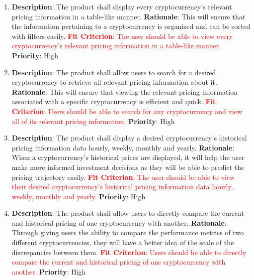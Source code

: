\documentclass[12pt, titlepage]{article}
\begin{document}
\begin{enumerate}[label = FR-\arabic*, left=\parindent, series=fr]
    \item \textbf{Description}: The product shall display every cryptocurrency's relevant pricing information in a table-like manner.
    \newline \textbf{Rationale}: This will ensure that the information pertaining to a cryptocurrency is organized and can be sorted with filters easily.
    \newline \textcolor{red} {\textbf{Fit Criterion}: The user should be able to view every cryptocurrency's relevant pricing information in a table-like manner.}
    \newline \textbf{Priority}: High

    \item \textbf{Description}: The product shall allow users to search for a desired cryptocurrency to retrieve all relevant pricing information about it.
    \newline \textbf{Rationale}: This will ensure that viewing the relevant pricing information associated with a specific cryptocurrency is efficient and quick.
    \newline \textcolor{red} {\textbf{Fit Criterion}: Users should be able to search for any cryptocurrency and view all of its relevant pricing information.}
    \newline \textbf{Priority}: High

    \item \textbf{Description}: The product shall display a desired cryptocurrency's historical pricing information data hourly, weekly, monthly and yearly.
    \newline \textbf{Rationale}: When a cryptocurrency's historical prices are displayed, it will help the user make more informed investment decisions
    as they will be able to predict the pricing trajectory easily.
    \newline \textcolor{red} {\textbf{Fit Criterion}: The user should be able to view their desired cryptocurrency's historical pricing information data hourly, weekly, monthly and yearly.}
    \newline \textbf{Priority}: High

    \item \textbf{Description}: The product shall allow users to directly compare the current and historical pricing of one cryptocurrency with another.
    \newline \textbf{Rationale}: Through giving users the ability to compare the performance metrics of two different cryptocurrencies, they will have
    a better idea of the scale of the discrepancies between them. 
    \newline \textcolor{red} {\textbf{Fit Criterion}: Users should be able to directly compare the current and historical pricing of one cryptocurrency with another.}
    \newline \textbf{Priority}: High


\end{enumerate}
\end{document}
